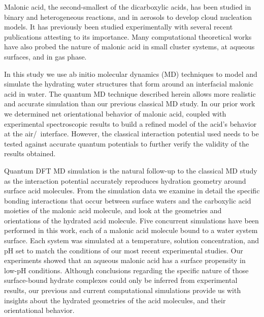 Malonic acid, the second-smallest of the dicarboxylic acids, has been studied in binary and heterogeneous reactions, and in aerosols to develop cloud nucleation models.\cite{Giebl2002,Finlayson-Pitts2009} It has previously been studied experimentally with several recent publications attesting to its importance.\cite{Parsons2004,Braban2003,Hansen2004,Hyvarinen2006,Riipinen2007} Many computational theoretical works have also probed the nature of malonic acid in small cluster systems, at aqueous surfaces, and in gas phase.\cite{Nguyen2005,Merchan1984,Ma2011}

In this study we use ab initio molecular dynamics (MD) techniques to model and simulate the hydrating water structures that form around an interfacial malonic acid in water. The quantum MD technique described herein allows more realistic and accurate simulation than our previous classical MD study.\cite{Blower2012} In our prior work we determined net orientational behavior of malonic acid, coupled with experimental spectroscopic results to build a refined model of the acid's behavior at the air/\wat~interface. However, the classical interaction potential used needs to be tested against accurate quantum potentials to further verify the validity of the results obtained.

Quantum DFT MD simulation is the natural follow-up to the classical MD study as the interaction potential accurately reproduces hydration geometry around surface acid molecules. From the simulation data we examine in detail the specific bonding interactions that occur between surface waters and the carboxylic acid moieties of the malonic acid molecule, and look at the geometries and orientations of the hydrated acid molecule. Five concurrent simulations have been performed in this work, each of a malonic acid molecule bound to a water system surface. Each system was simulated at a temperature, solution concentration, and pH set to match the conditions of our most recent experimental studies.\cite{Blower2012} Our experiments showed that an aqueous malonic acid has a surface propensity in low-pH conditions. Although conclusions regarding the specific nature of those surface-bound hydrate complexes could only be inferred from experimental results, our previous and current computational simulations provide us with insights about the hydrated geometries of the acid molecules, and their orientational behavior.

